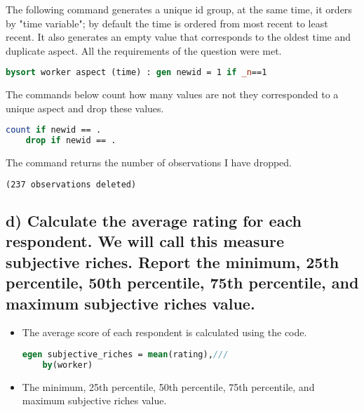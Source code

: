 \documentclass[12pt,a4paper]{article}
\begin{document}
	\noindent
	The following command generates a unique id group, at the same time, it orders by "time variable"; by default the time is ordered from most recent to least recent. It also generates an empty value that corresponds to the oldest time and duplicate aspect. All the requirements of the question were met.
	
	\begin{lstlisting}[language=Stata]
	bysort worker aspect (time) : gen newid = 1 if _n==1
	\end{lstlisting} 
	
	\noindent
	The commands below count how many values ​​are not
	they corresponded to a unique aspect and drop these values.
	
	\begin{lstlisting}[language=Stata]
	count if newid == .	
	drop if newid == .
	\end{lstlisting}
	
	\noindent
	The command returns the number of observations I have dropped.
	
	\begin{lstlisting}[language=Stata]
		(237 observations deleted)
	\end{lstlisting}
	
	\subsection*{\normalsize{d) Calculate the average rating for each respondent. We will call this measure subjective riches. Report the minimum, 25th percentile, 50th percentile, 75th percentile, and maximum subjective riches value.}}	
	
	\begin{itemize}
		\item The average score of each respondent is calculated using the code. 
	\noindent	
	\begin{lstlisting}[language=Stata]
	egen subjective_riches = mean(rating),///
	by(worker)
	\end{lstlisting}
		
		\item The minimum, 25th percentile, 50th percentile, 75th percentile, and maximum subjective riches value.
	
			\begin{table}[htbp]
			\end{table}
	
	\end{itemize}
	
\end{document}

